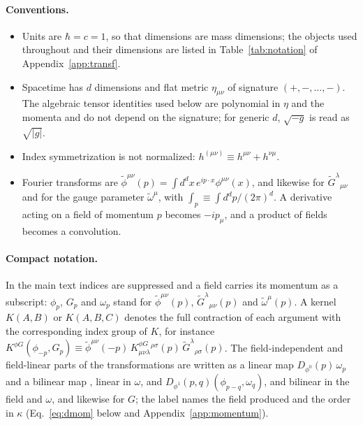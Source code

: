 \documentclass[prd,aps,preprint,superscriptaddress,nofootinbib,amsmath,amssymb,eqsecnum]{revtex4-2}
\newcommand{\tomega}{\tilde{\omega}}
\newcommand{\p}{\tilde{\phi}}
\newcommand{\G}{\tilde{G}}
\newcommand{\ip}[1]{\int_{#1}}
\providecommand{\DIFaddtex}[1]{{\protect\color{blue} \sf #1}} %
\providecommand{\DIFdeltex}[1]{{\protect\color{red} \scriptsize #1}} %
\providecommand{\DIFaddbegin}{} %
\providecommand{\DIFaddend}{} %
\providecommand{\DIFdelbegin}{} %
\providecommand{\DIFdelend}{} %
\providecommand{\DIFadd}[1]{\texorpdfstring{\DIFaddtex{#1}}{#1}} %
\providecommand{\DIFdel}[1]{\texorpdfstring{\DIFdeltex{#1}}{}} %
\begin{document}
\paragraph{Conventions.}
\begin{itemize}
\item Units are $\hbar=c=1$, so that dimensions are mass dimensions; the objects used
throughout and their dimensions are listed in Table~\ref{tab:notation} of
Appendix~\ref{app:transf}.
\item Spacetime has $d$ dimensions and flat metric $\eta_{\mu\nu}$ of signature
$(+,-,\dots,-)$. The algebraic tensor identities used below are polynomial in $\eta$ and the
momenta and do not depend on the signature; for generic $d$, $\sqrt{-g}$ is read as
$\sqrt{|g|}$.
\item Index symmetrization is not normalized: $h^{(\mu\nu)}\equiv h^{\mu\nu}+h^{\nu\mu}$.
\item Fourier transforms are $\p^{\mu\nu}(p)=\int d^dx\,e^{ip\cdot x}\phi^{\mu\nu}(x)$, and
likewise for $\G^{\lambda}{}_{\mu\nu}$ and for the gauge parameter $\tomega^\mu$, with
$\ip{p}\equiv\int d^dp/(2\pi)^d$. A derivative acting on a field of momentum $p$ becomes
$-ip_\mu$, and a product of fields becomes a convolution.
\end{itemize}

\paragraph{Compact notation.} In the main text indices are suppressed and a field carries
its momentum as a subscript: $\phi_p$, $G_p$ and $\omega_p$ stand for $\p^{\mu\nu}(p)$,
$\G^{\lambda}{}_{\mu\nu}(p)$ and $\tomega^\mu(p)$. A kernel $K(A,B)$ or $K(A,B,C)$ denotes the
full contraction of each argument with the corresponding index group of $K$, for instance
$K^{\phi G}(\phi_{-p},G_p)\equiv\p^{\mu\nu}(-p)\,K^{\phi G}_{\mu\nu\lambda}{}^{\rho\sigma}(p)\,\G^{\lambda}{}_{\rho\sigma}(p)$.
The field-independent and field-linear parts of the transformations are written as
\DIFdelbegin \DIFdel{a linear
map }\DIFdelend $D_{\phi^0}(p)\,\omega_p$\DIFdelbegin \DIFdel{and a bilinear map }\DIFdelend \DIFaddbegin \DIFadd{, linear in $\omega$, and }\DIFaddend $D_{\phi^1}(p,q)(\phi_{p-q},\omega_q)$, \DIFdelbegin \DIFdel{and
}\DIFdelend \DIFaddbegin \DIFadd{bilinear in the field and $\omega$, and
}\DIFaddend likewise for $G$; the label names the field produced and the order in $\kappa$
(Eq.~\eqref{eq:dmom} below and Appendix~\ref{app:momentum}).
\end{document}
